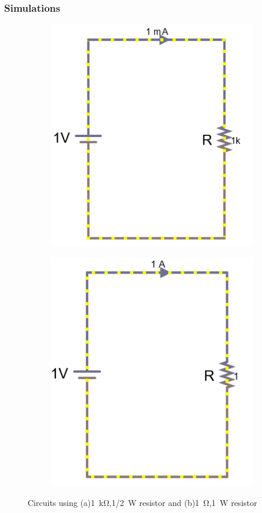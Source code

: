 \documentclass[a4paper]{article}
\begin{document}
\subsubsection{Simulations}
\begin{figure}[H]
    \begin{subfigure}{0.40\textwidth}
        \includegraphics[width=.9\linewidth]{heat1}
    \caption{}
    \end{subfigure}
    \hspace{0.20\textwidth}
    \begin{subfigure}{0.40\textwidth}
        \includegraphics[width=.9\linewidth]{heat2}
    \caption{}
    \end{subfigure}
    \caption{Circuits using (a)\SI{1}{\kilo\ohm},\SI{1/2}{\watt} resistor and
    (b)\SI{1}{\ohm},\SI{1}{\watt} resistor }
\end{figure}
\end{document}
